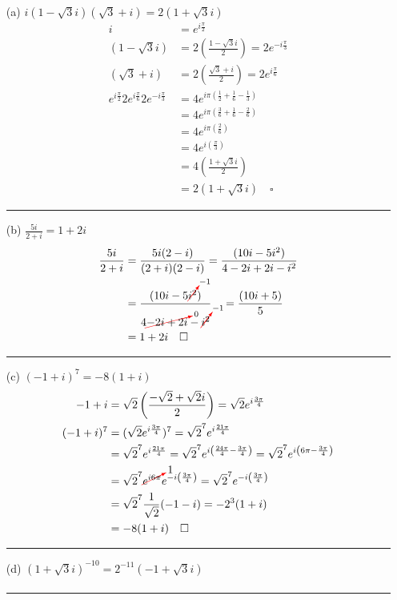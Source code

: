 \documentclass{article}
\newcommand{\canceling}[2]{\textcolor{red}{\cancelto{\textcolor{black}{#1}}{\textcolor{black}{#2}}}}
\begin{document}
\begin{enumerate}
\item[(a)] $i(1-\sqrt{3}i)(\sqrt{3} + i) = 2(1 + \sqrt{3}i)$
  \begin{align*}
    i &= e^{i\frac{\pi}{2}}\\
    (1-\sqrt{3}i) &= 2\left(\frac{1-\sqrt{3}i}{2}\right) = 2e^{-i\frac{\pi}{3}}\\
    (\sqrt{3} + i)&= 2\left(\frac{\sqrt{3} + i}{2}\right) = 2e^{i\frac{\pi}{6}}\\
    e^{i\frac{\pi}{2}}2e^{i\frac{\pi}{6}}2e^{-i\frac{\pi}{3}} &= 4e^{i\pi\left(\frac{1}{2} + \frac{1}{6} - \frac{1}{3}\right)} \\
      &= 4e^{i\pi\left(\frac{3}{6} + \frac{1}{6} - \frac{2}{6}\right)} \\
      &= 4e^{i\pi\left(\frac{2}{6}\right)}\\ 
      &= 4e^{i\left(\frac{\pi}{3}\right)}\\
      &= 4\left(\frac{1+\sqrt{3}i}{2}\right)\\
    &= 2(1+\sqrt{3}i)\quad \square
  \end{align*}
\hrule
\item[(b)] $\frac{5i}{2+i} = 1+2i$
  \begin{align*}
    \frac{5i}{2+i} &= \frac{5i(2-i)}{(2+i)(2-i)} = \frac{(10i-5i^2)}{4 -2i + 2i -i^2} \\
    &= \frac{(10i-5\canceling{-1}{i^2})}{4 \canceling{0}{-2i + 2i} -\canceling{-1}{i^2}} \quad = \frac{(10i+5)}{5} \\
    &= 1 + 2i \quad \square
  \end{align*}
\hrule
\item[(c)] $(-1 + i)^7 = -8(1+i)$
  \begin{align*}
    -1 + i &= \sqrt{2}\left(\frac{-\sqrt{2}+\sqrt{2}i}{2}\right) = \sqrt{2}e^{i\frac{3\pi}{4}}\\
    (-1 + i)^7 &= (\sqrt{2}e^{i\frac{3\pi}{4}})^7 = \sqrt{2}^7e^{i\frac{21\pi}{4}}\\
           &= \sqrt{2}^7e^{i\frac{21\pi}{4}} = \sqrt{2}^7e^{i\left(\frac{24\pi}{4} - \frac{3\pi}{4}\right)} = \sqrt{2}^7e^{i\left(6\pi - \frac{3\pi}{4}\right)} \\
           &= \sqrt{2}^7\canceling{1}{e^{i6\pi}}e^{-i\left(\frac{3\pi}{4}\right)} = \sqrt{2}^7e^{-i\left(\frac{3\pi}{4}\right)} \\
           &= \sqrt{2}^7\frac{1}{\sqrt{2}}(-1-i) = -2^3(1+i) \\
           &= -8(1+i)\quad \square \\
  \end{align*}
\hrule
\item[(d)] $(1 + \sqrt{3}i)^{-10}= 2^{-11}(-1 + \sqrt{3}i)$
  \begin{align*}
  \end{align*}
\hrule
\end{enumerate}
\end{document}
